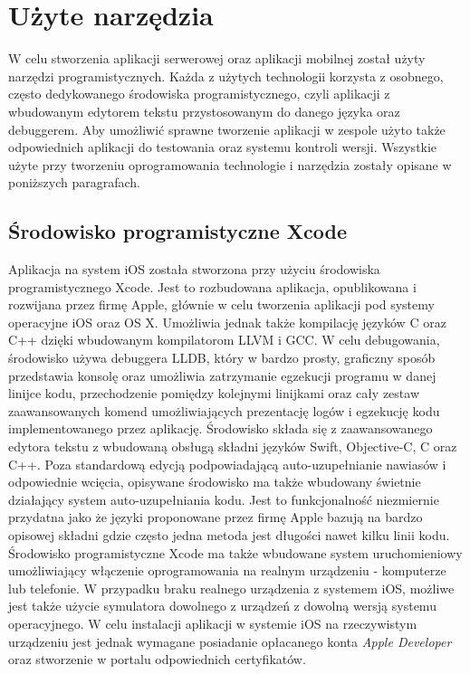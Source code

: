 \section{Użyte narzędzia}

W celu stworzenia aplikacji serwerowej oraz aplikacji mobilnej został użyty narzędzi programistycznych. Każda z użytych technologii korzysta z osobnego, często dedykowanego środowiska programistycznego, czyli aplikacji z wbudowanym edytorem tekstu przystosowanym do danego języka oraz debuggerem. Aby umożliwić sprawne tworzenie aplikacji w zespole użyto także odpowiednich aplikacji do testowania oraz systemu kontroli wersji. Wszystkie użyte przy tworzeniu oprogramowania technologie i narzędzia zostały opisane w poniższych paragrafach.

\subsection{Środowisko programistyczne Xcode}

Aplikacja na system iOS została stworzona przy użyciu środowiska programistycznego Xcode. Jest to rozbudowana aplikacja, opublikowana i rozwijana przez firmę Apple, głównie w celu tworzenia aplikacji pod systemy operacyjne iOS oraz OS X. Umożliwia jednak także kompilację języków C oraz C++ dzięki wbudowanym kompilatorom LLVM i GCC. W celu debugowania, środowisko używa debuggera LLDB, który w bardzo prosty, graficzny sposób przedstawia konsolę oraz umożliwia zatrzymanie egzekucji programu w danej linijce kodu, przechodzenie pomiędzy kolejnymi linijkami oraz cały zestaw zaawansowanych komend umożliwiających prezentację logów i egzekucję kodu implementowanego przez aplikację. Środowisko składa się z zaawansowanego edytora tekstu z wbudowaną obsługą składni języków Swift, Objective-C, C oraz C++. Poza standardową edycją podpowiadającą auto-uzupełnianie nawiasów i odpowiednie wcięcia, opisywane środowisko ma także wbudowany świetnie działający system auto-uzupełniania kodu. Jest to funkcjonalność niezmiernie przydatna jako że języki proponowane przez firmę Apple bazują na bardzo opisowej składni gdzie często jedna metoda jest długości nawet kilku linii kodu.\newline
Środowisko programistyczne Xcode ma także wbudowane system uruchomieniowy umożliwiający włączenie oprogramowania na realnym urządzeniu - komputerze lub telefonie. W przypadku braku realnego urządzenia z systemem iOS, możliwe jest także użycie symulatora dowolnego z urządzeń z dowolną wersją systemu operacyjnego. W celu instalacji aplikacji w systemie iOS na rzeczywistym urządzeniu jest jednak wymagane posiadanie opłacanego konta \textit{Apple Developer} oraz stworzenie w portalu odpowiednich certyfikatów.

